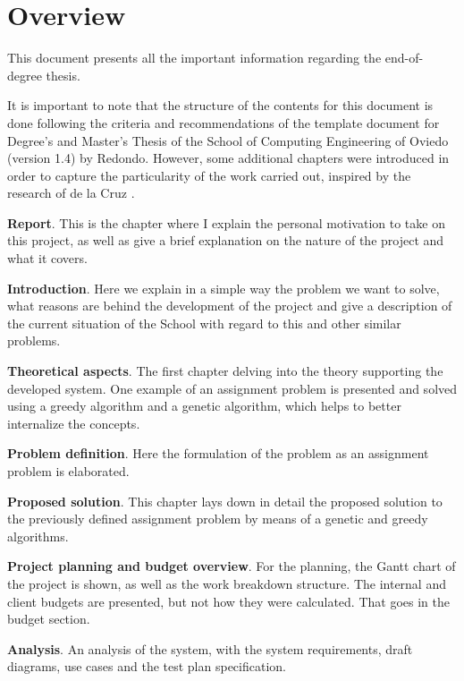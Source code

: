 \renewcommand{\documentname}{Overview}

\chapter{Overview}

This document presents all the important information regarding the \textit{\tfg} end-of-degree thesis.

It is important to note that the structure of the contents for this document is done following the criteria and recommendations of the template document for Degree's and Master's Thesis of the School of Computing Engineering of Oviedo (version 1.4) \cite{doc-template} by Redondo. However, some additional chapters were introduced in order to capture the particularity of the work carried out, inspired by the research of de la Cruz \cite{metaheuristics-groups}.

\textbf{Report}. This is the chapter where I explain the personal motivation to take on this project, as well as give a brief explanation on the nature of the project and what it covers. 

\textbf{Introduction}. Here we explain in a simple way the problem we want to solve, what reasons are behind the development of the project and give a description of the current situation of the School with regard to this and other similar problems.

\textbf{Theoretical aspects}. The first chapter delving into the theory supporting the developed system. One example of an assignment problem is presented and solved using a greedy algorithm and a genetic algorithm, which helps to better internalize the concepts.

\textbf{Problem definition}. Here the formulation of the problem as an assignment problem is elaborated. 

\textbf{Proposed solution}. This chapter lays down in detail the proposed solution to the previously defined assignment problem by means of a genetic and greedy algorithms.

\textbf{Project planning and budget overview}. For the planning, the Gantt chart of the project is shown, as well as the work breakdown structure. The internal and client budgets are presented, but not how they were calculated. That goes in the budget section.

\textbf{Analysis}. An analysis of the system, with the system requirements, draft diagrams, use cases and the test plan specification. 

